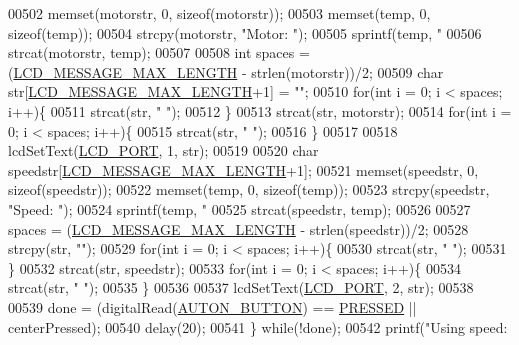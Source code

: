 \begin{DoxyCode}
{{{{{00502         memset(motorstr, 0, \textcolor{keyword}{sizeof}(motorstr));
00503         memset(temp, 0, \textcolor{keyword}{sizeof}(temp));
00504         strcpy(motorstr, \textcolor{stringliteral}{"Motor: "});
00505         sprintf(temp, \textcolor{stringliteral}{"%
00506         strcat(motorstr, temp);
00507 
00508         \textcolor{keywordtype}{int} spaces = (\hyperlink{lcdmsg_8h_abe4c4b70fc6f44ae3680e5b2c68cdd00}{LCD\_MESSAGE\_MAX\_LENGTH} - strlen(motorstr))/2;
00509         \textcolor{keywordtype}{char} str[\hyperlink{lcdmsg_8h_abe4c4b70fc6f44ae3680e5b2c68cdd00}{LCD\_MESSAGE\_MAX\_LENGTH}+1] = \textcolor{stringliteral}{""};
00510         \textcolor{keywordflow}{for}(\textcolor{keywordtype}{int} i = 0; i < spaces; i++)\{
00511             strcat(str, \textcolor{stringliteral}{" "});
00512         \}
00513         strcat(str, motorstr);
00514         \textcolor{keywordflow}{for}(\textcolor{keywordtype}{int} i = 0; i < spaces; i++)\{
00515             strcat(str, \textcolor{stringliteral}{" "});
00516         \}
00517 
00518         lcdSetText(\hyperlink{lcdmsg_8h_abcf42bd88b3c36193f301ca25b033875}{LCD\_PORT}, 1, str);
00519 
00520         \textcolor{keywordtype}{char} speedstr[\hyperlink{lcdmsg_8h_abe4c4b70fc6f44ae3680e5b2c68cdd00}{LCD\_MESSAGE\_MAX\_LENGTH}+1];
00521         memset(speedstr, 0, \textcolor{keyword}{sizeof}(speedstr));
00522         memset(temp, 0, \textcolor{keyword}{sizeof}(temp));
00523         strcpy(speedstr, \textcolor{stringliteral}{"Speed: "});
00524         sprintf(temp, \textcolor{stringliteral}{"%
00525         strcat(speedstr, temp);
00526 
00527         spaces = (\hyperlink{lcdmsg_8h_abe4c4b70fc6f44ae3680e5b2c68cdd00}{LCD\_MESSAGE\_MAX\_LENGTH} - strlen(speedstr))/2;
00528         strcpy(str, \textcolor{stringliteral}{""});
00529         \textcolor{keywordflow}{for}(\textcolor{keywordtype}{int} i = 0; i < spaces; i++)\{
00530             strcat(str, \textcolor{stringliteral}{" "});
00531         \}
00532         strcat(str, speedstr);
00533         \textcolor{keywordflow}{for}(\textcolor{keywordtype}{int} i = 0; i < spaces; i++)\{
00534             strcat(str, \textcolor{stringliteral}{" "});
00535         \}
00536 
00537         lcdSetText(\hyperlink{lcdmsg_8h_abcf42bd88b3c36193f301ca25b033875}{LCD\_PORT}, 2, str);
00538 
00539         done = (digitalRead(\hyperlink{autonrecorder_8h_a5e5e9512ca0c5f741113ae51b24258c1}{AUTON\_BUTTON}) == \hyperlink{friendly_8h_a654adff3c664f27f0b29c24af818dd26}{PRESSED} || centerPressed);
00540         delay(20);
00541     \} \textcolor{keywordflow}{while}(!done);
00542     printf(\textcolor{stringliteral}{"Using speed: %
}}}}}}}}
\end{DoxyCode}
